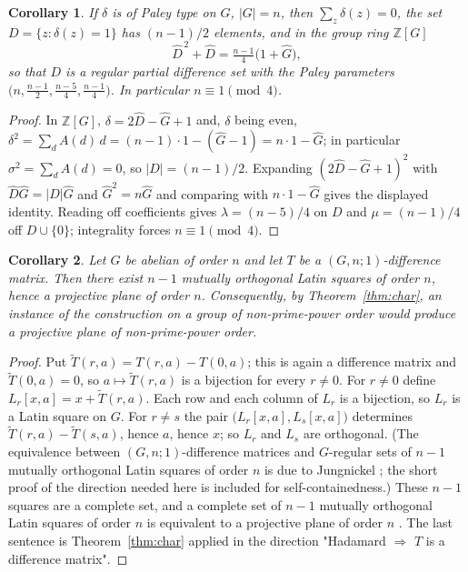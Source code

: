 \documentclass[11pt]{article}
\newtheorem{corollary}{Corollary}
\newcommand{\Z}{\mathbb Z}
\begin{document}
\begin{corollary}\label{cor:mod4}
If \(\delta\) is of Paley type on \(G\), \(|G|=n\), then
\(\sum_z\delta(z)=0\), the set \(D=\{z:\delta(z)=1\}\) has \((n-1)/2\)
elements, and in the group ring \(\Z[G]\)
\[
        \widehat D^{\,2}+\widehat D=\tfrac{n-1}{4}\bigl(1+\widehat G\bigr),
\]
so that \(D\) is a regular partial difference set with the Paley parameters
\(\bigl(n,\tfrac{n-1}{2},\tfrac{n-5}{4},\tfrac{n-1}{4}\bigr)\).  In
particular \(n\equiv1\pmod4\).
\end{corollary}

\begin{proof}
In \(\Z[G]\), \(\delta=2\widehat D-\widehat G+1\) and, \(\delta\) being even,
\(\delta^{2}=\sum_{d}A(d)\,d=(n-1)\cdot1-(\widehat G-1)=n\cdot1-\widehat G\);
in particular \(\sigma^{2}=\sum_dA(d)=0\), so \(|D|=(n-1)/2\).  Expanding
\((2\widehat D-\widehat G+1)^{2}\) with \(\widehat D\widehat G=|D|\widehat G\)
and \(\widehat G^{2}=n\widehat G\) and comparing with \(n\cdot1-\widehat G\)
gives the displayed identity.  Reading off coefficients gives
\(\lambda=(n-5)/4\) on \(D\) and \(\mu=(n-1)/4\) off \(D\cup\{0\}\);
integrality forces \(n\equiv1\pmod4\).
\end{proof}

\begin{corollary}\label{cor:plane}
Let \(G\) be abelian of order \(n\) and let \(T\) be a
\((G,n;1)\)-difference matrix.  Then there exist \(n-1\) mutually orthogonal
Latin squares of order \(n\), hence a projective plane of order \(n\).
Consequently, by Theorem~\ref{thm:char}, an instance of the construction on a
group of non-prime-power order would produce a projective plane of
non-prime-power order.
\end{corollary}

\begin{proof}
Put \(\widetilde T(r,a)=T(r,a)-T(0,a)\); this is again a difference matrix and
\(\widetilde T(0,a)=0\), so \(a\mapsto\widetilde T(r,a)\) is a bijection for
every \(r\neq0\).  For \(r\neq0\) define \(L_r[x,a]=x+\widetilde T(r,a)\).
Each row and each column of \(L_r\) is a bijection, so \(L_r\) is a Latin
square on \(G\).  For \(r\neq s\) the pair \(\bigl(L_r[x,a],L_s[x,a]\bigr)\)
determines \(\widetilde T(r,a)-\widetilde T(s,a)\), hence \(a\), hence \(x\);
so \(L_r\) and \(L_s\) are orthogonal.  (The equivalence between
\((G,n;1)\)-difference matrices and \(G\)-regular sets of \(n-1\) mutually
orthogonal Latin squares of order \(n\) is due to Jungnickel
\cite[Thm.~1]{Jungnickel1980}; the short proof of the direction needed here
is included for self-containedness.)  These \(n-1\) squares are a complete
set, and a complete set of \(n-1\) mutually orthogonal Latin squares of order
\(n\) is equivalent to a projective plane of order \(n\)
\cite{ColbournDinitz2007}.  The last sentence is Theorem~\ref{thm:char}
applied in the direction "Hadamard \(\Rightarrow\) \(T\) is a difference
matrix".
\end{proof}
\end{document}

